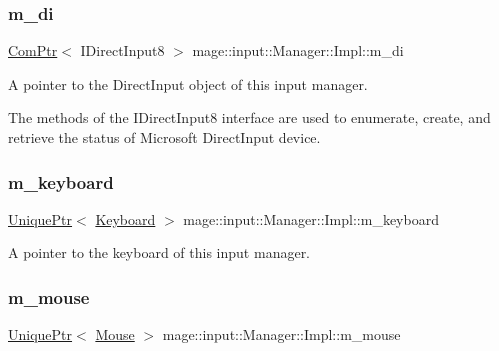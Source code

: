 \subsubsection{\texorpdfstring{m\+\_\+di}{m\_di}}
{\footnotesize\ttfamily \hyperlink{namespacemage_ae74f374780900893caa5555d1031fd79}{Com\+Ptr}$<$ I\+Direct\+Input8 $>$ mage\+::input\+::\+Manager\+::\+Impl\+::m\+\_\+di\hspace{0.3cm}{\ttfamily [private]}}

A pointer to the Direct\+Input object of this input manager.

The methods of the I\+Direct\+Input8 interface are used to enumerate, create, and retrieve the status of Microsoft Direct\+Input device. \hypertarget{classmage_1_1input_1_1_manager_1_1_impl_a2b41f999b73742a6c3cb7ba9e86aee9e}{}\label{classmage_1_1input_1_1_manager_1_1_impl_a2b41f999b73742a6c3cb7ba9e86aee9e} 
\subsubsection{\texorpdfstring{m\+\_\+keyboard}{m\_keyboard}}
{\footnotesize\ttfamily \hyperlink{namespacemage_a3316d7143a973e37adf1110f2e80ca31}{Unique\+Ptr}$<$ \hyperlink{classmage_1_1input_1_1_keyboard}{Keyboard} $>$ mage\+::input\+::\+Manager\+::\+Impl\+::m\+\_\+keyboard\hspace{0.3cm}{\ttfamily [private]}}

A pointer to the keyboard of this input manager. \hypertarget{classmage_1_1input_1_1_manager_1_1_impl_aeae8977636864dddcbcdb69ecefca133}{}\label{classmage_1_1input_1_1_manager_1_1_impl_aeae8977636864dddcbcdb69ecefca133} 
\subsubsection{\texorpdfstring{m\+\_\+mouse}{m\_mouse}}
{\footnotesize\ttfamily \hyperlink{namespacemage_a3316d7143a973e37adf1110f2e80ca31}{Unique\+Ptr}$<$ \hyperlink{classmage_1_1input_1_1_mouse}{Mouse} $>$ mage\+::input\+::\+Manager\+::\+Impl\+::m\+\_\+mouse\hspace{0.3cm}{\ttfamily [private]}}

